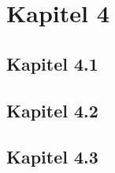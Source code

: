 \section{Kapitel 4}
\subsection{Kapitel 4.1}

\subsection{Kapitel 4.2}

\subsection{Kapitel 4.3}
\newpage